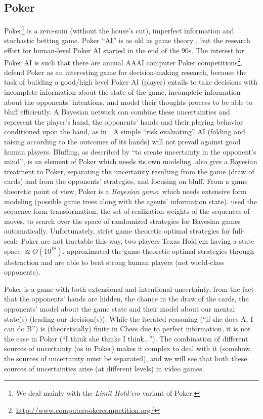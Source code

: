 \subsection{Poker}
Poker\footnote{We deal mainly with the \textit{Limit Hold'em} variant of Poker.} is a zero-sum (without the house's cut), imperfect information and stochastic betting game. Poker ``AI'' is as old as game theory \citep{nash51a}, but the research effort for human-level Poker AI started in the end of the 90s. The interest for Poker AI is such that there are annual AAAI computer Poker competitions\footnote{\url{http://www.computerpokercompetition.org/}}. \citet{Billings98pokeras} defend Poker as an interesting game for decision-making research, %
because the task of building a good/high level Poker AI (player) entails to take decisions with incomplete information about the state of the game, incomplete information about the opponents' intentions, and model their thoughts process to be able to bluff efficiently. A Bayesian network can combine these uncertainties and represent the player's hand, the opponents' hands and their playing behavior conditioned upon the hand, as in \citep{Korb99bayesianpoker}. A simple ``risk evaluating'' AI (folding and raising according to the outcomes of its hands) will not prevail against good human players. Bluffing, as described by \citet{VonNeumannMorgenstern1944} ``to create uncertainty in the opponent's mind'', is an element of Poker which needs its own modeling. \citet{Southey05bayesbluff} also give a Bayesian treatment to Poker, separating the uncertainty resulting from the game (draw of cards) and from the opponents' strategies, and focusing on bluff. From a game theoretic point of view, Poker is a \textit{Bayesian game}, which needs extensive form modeling (possible game trees along with the agents' information state). \citet{Koller97representationsand} used the sequence form transformation, the set of realization weights of the sequences of moves, %
to search over the space of randomized strategies for Bayesian games automatically. Unfortunately, strict game theoretic optimal strategies for full-scale Poker are not tractable this way, two players Texas Hold'em having a state space $\approxeq O(10^18)$. \citet{BillingsBDHSSS03} approximated the game-theoretic optimal strategies through abstraction and are able to beat strong human players (not world-class opponents).

Poker is a game with both extensional and intentional uncertainty, from the fact that the opponents' hands are hidden, the chance in the draw of the cards, the opponents' model about the game state and their model about our mental state(s) (leading our decision(s)). While the iterated reasoning (``if she does A, I can do B'') is (theoretically) finite in Chess due to perfect information, it is not the case in Poker (``I think she thinks I think...''). The combination of different sources of uncertainty (as in Poker) makes it complex to deal with it (somehow, the sources of uncertainty must be separated), and we will see that both these sources of uncertainties arise (at different levels) in video games.

